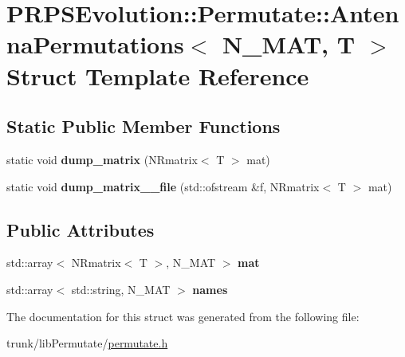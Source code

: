 \hypertarget{struct_p_r_p_s_evolution_1_1_permutate_1_1_antenna_permutations}{\section{P\-R\-P\-S\-Evolution\-:\-:Permutate\-:\-:Antenna\-Permutations$<$ N\-\_\-\-M\-A\-T, T $>$ Struct Template Reference}
\label{struct_p_r_p_s_evolution_1_1_permutate_1_1_antenna_permutations}
}
\subsection*{Static Public Member Functions}
\begin{DoxyCompactItemize}
\item 
\hypertarget{struct_p_r_p_s_evolution_1_1_permutate_1_1_antenna_permutations_a1b993d1d3af180e69b2d864bb23b7deb}{static void {\bfseries dump\-\_\-matrix} (N\-Rmatrix$<$ T $>$ mat)}\label{struct_p_r_p_s_evolution_1_1_permutate_1_1_antenna_permutations_a1b993d1d3af180e69b2d864bb23b7deb}

\item 
\hypertarget{struct_p_r_p_s_evolution_1_1_permutate_1_1_antenna_permutations_a8830c191537456f651021d2c32be2b63}{static void {\bfseries dump\-\_\-matrix\-\_\-\_\-file} (std\-::ofstream \&f, N\-Rmatrix$<$ T $>$ mat)}\label{struct_p_r_p_s_evolution_1_1_permutate_1_1_antenna_permutations_a8830c191537456f651021d2c32be2b63}

\end{DoxyCompactItemize}
\subsection*{Public Attributes}
\begin{DoxyCompactItemize}
\item 
\hypertarget{struct_p_r_p_s_evolution_1_1_permutate_1_1_antenna_permutations_a4c2a15678968ce79f6332e272bfc9226}{std\-::array$<$ N\-Rmatrix$<$ T $>$, N\-\_\-\-M\-A\-T $>$ {\bfseries mat}}\label{struct_p_r_p_s_evolution_1_1_permutate_1_1_antenna_permutations_a4c2a15678968ce79f6332e272bfc9226}

\item 
\hypertarget{struct_p_r_p_s_evolution_1_1_permutate_1_1_antenna_permutations_ab929cd371b9c25afcd6f0acd40490792}{std\-::array$<$ std\-::string, N\-\_\-\-M\-A\-T $>$ {\bfseries names}}\label{struct_p_r_p_s_evolution_1_1_permutate_1_1_antenna_permutations_ab929cd371b9c25afcd6f0acd40490792}

\end{DoxyCompactItemize}


The documentation for this struct was generated from the following file\-:\begin{DoxyCompactItemize}
\item 
trunk/lib\-Permutate/\hyperlink{permutate_8h}{permutate.\-h}\end{DoxyCompactItemize}
